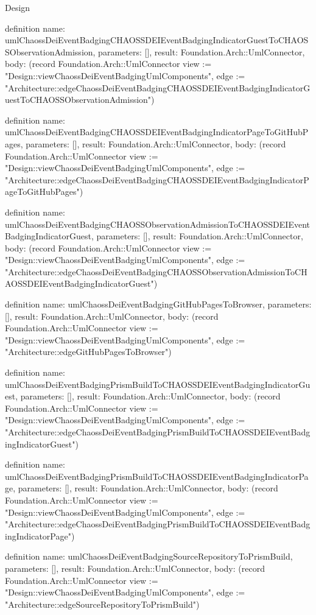 \begin{lexlean}{Design}
\begin{semanticmodule}
definition{
  name: umlChaossDeiEventBadgingCHAOSSDEIEventBadgingIndicatorGuestToCHAOSSObservationAdmission,
  parameters: [],
  result: Foundation.Arch::UmlConnector,
  body: (record Foundation.Arch::UmlConnector {view := "Design::viewChaossDeiEventBadgingUmlComponents", edge := "Architecture::edgeChaossDeiEventBadgingCHAOSSDEIEventBadgingIndicatorGuestToCHAOSSObservationAdmission"})
}

definition{
  name: umlChaossDeiEventBadgingCHAOSSDEIEventBadgingIndicatorPageToGitHubPages,
  parameters: [],
  result: Foundation.Arch::UmlConnector,
  body: (record Foundation.Arch::UmlConnector {view := "Design::viewChaossDeiEventBadgingUmlComponents", edge := "Architecture::edgeChaossDeiEventBadgingCHAOSSDEIEventBadgingIndicatorPageToGitHubPages"})
}

definition{
  name: umlChaossDeiEventBadgingCHAOSSObservationAdmissionToCHAOSSDEIEventBadgingIndicatorGuest,
  parameters: [],
  result: Foundation.Arch::UmlConnector,
  body: (record Foundation.Arch::UmlConnector {view := "Design::viewChaossDeiEventBadgingUmlComponents", edge := "Architecture::edgeChaossDeiEventBadgingCHAOSSObservationAdmissionToCHAOSSDEIEventBadgingIndicatorGuest"})
}

definition{
  name: umlChaossDeiEventBadgingGitHubPagesToBrowser,
  parameters: [],
  result: Foundation.Arch::UmlConnector,
  body: (record Foundation.Arch::UmlConnector {view := "Design::viewChaossDeiEventBadgingUmlComponents", edge := "Architecture::edgeGitHubPagesToBrowser"})
}

definition{
  name: umlChaossDeiEventBadgingPrismBuildToCHAOSSDEIEventBadgingIndicatorGuest,
  parameters: [],
  result: Foundation.Arch::UmlConnector,
  body: (record Foundation.Arch::UmlConnector {view := "Design::viewChaossDeiEventBadgingUmlComponents", edge := "Architecture::edgeChaossDeiEventBadgingPrismBuildToCHAOSSDEIEventBadgingIndicatorGuest"})
}

definition{
  name: umlChaossDeiEventBadgingPrismBuildToCHAOSSDEIEventBadgingIndicatorPage,
  parameters: [],
  result: Foundation.Arch::UmlConnector,
  body: (record Foundation.Arch::UmlConnector {view := "Design::viewChaossDeiEventBadgingUmlComponents", edge := "Architecture::edgeChaossDeiEventBadgingPrismBuildToCHAOSSDEIEventBadgingIndicatorPage"})
}

definition{
  name: umlChaossDeiEventBadgingSourceRepositoryToPrismBuild,
  parameters: [],
  result: Foundation.Arch::UmlConnector,
  body: (record Foundation.Arch::UmlConnector {view := "Design::viewChaossDeiEventBadgingUmlComponents", edge := "Architecture::edgeSourceRepositoryToPrismBuild"})
}


\end{semanticmodule}
\end{lexlean}
